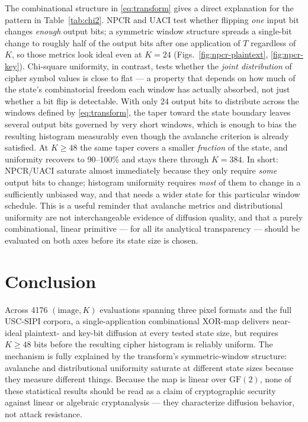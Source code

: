 \documentclass[conference]{IEEEtran}
\begin{document}
The combinational structure in \eqref{eq:transform} gives a direct
explanation for the pattern in Table~\ref{tab:chi2}. NPCR and UACI test
whether flipping \emph{one} input bit changes \emph{enough} output bits;
a symmetric window structure spreads a single-bit change to roughly half
of the output bits after one application of $T$ regardless of $K$, so
those metrics look ideal even at $K=24$ (Figs.~\ref{fig:npcr-plaintext},
\ref{fig:npcr-key}). Chi-square uniformity, in contrast, tests whether the
\emph{joint distribution} of cipher symbol values is close to flat — a
property that depends on how much of the state's combinatorial freedom
each window has actually absorbed, not just whether a bit flip is
detectable. With only 24 output bits to distribute across the windows
defined by \eqref{eq:transform}, the taper toward the state boundary
leaves several output bits governed by very short windows, which is
enough to bias the resulting histogram measurably even though the
avalanche criterion is already satisfied. At $K \geq 48$ the same taper
covers a smaller \emph{fraction} of the state, and uniformity recovers to
90--100\% and stays there through $K=384$. In short: NPCR/UACI saturate
almost immediately because they only require \emph{some} output bits to
change; histogram uniformity requires \emph{most} of them to change in a
sufficiently unbiased way, and that needs a wider state for this
particular window schedule. This is a useful reminder that avalanche
metrics and distributional uniformity are not interchangeable evidence of
diffusion quality, and that a purely combinational, linear primitive — for
all its analytical transparency — should be evaluated on both axes before
its state size is chosen.

\section{Conclusion}

Across 4176 $(\text{image}, K)$ evaluations spanning three pixel formats
and the full USC-SIPI corpora, a single-application combinational XOR-map
delivers near-ideal plaintext- and key-bit diffusion at every tested state
size, but requires $K \geq 48$ bits before the resulting cipher histogram
is reliably uniform. The mechanism is fully explained by the transform's
symmetric-window structure: avalanche and distributional uniformity
saturate at different state sizes because they measure different things.
Because the map is linear over $\mathrm{GF}(2)$, none of these statistical
results should be read as a claim of cryptographic security against
linear or algebraic cryptanalysis — they characterize diffusion behavior,
not attack resistance.
\end{document}

